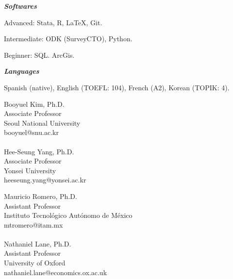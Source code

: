 \documentclass[11pt,article,oneside, a4paper]{memoir}
\begin{document}
\noindent\emph{\textbf{Softwares} \vspace{0.05in}}

\ind Advanced: Stata, R, \LaTeX, Git.

\ind Intermediate: ODK (SurveyCTO), Python.

\ind Beginner: SQL. ArcGis.

\medskip
\noindent\emph{\textbf{Languages} \vspace{0.05in}}

\ind Spanish (native), English (TOEFL: 104), French (A2), Korean (TOPIK: 4).

\medskip

\noindent
\begin{minipage}[t]{.5\textwidth}
  \raggedright
  Booyuel Kim, Ph.D.        \\
  Associate Professor       \\
  Seoul National University \\
  booyuel@snu.ac.kr         \\
  ~~                        \\
  Hee-Seung Yang, Ph.D.     \\
  Associate Professor       \\
  Yonsei University         \\
  heeseung.yang@yonsei.ac.kr
\end{minipage}%
\begin{minipage}[t]{.7\textwidth}
\raggedright
  Mauricio Romero, Ph.D.    \\
  Assistant Professor       \\
  Instituto Tecnológico Autónomo de México \\
  mtromero@itam.mx          \\
  ~~                        \\
  Nathaniel Lane, Ph.D.     \\
  Assistant Professor       \\
  University of Oxford      \\
  nathaniel.lane@economics.ox.ac.uk
\end{minipage}
\end{document}
